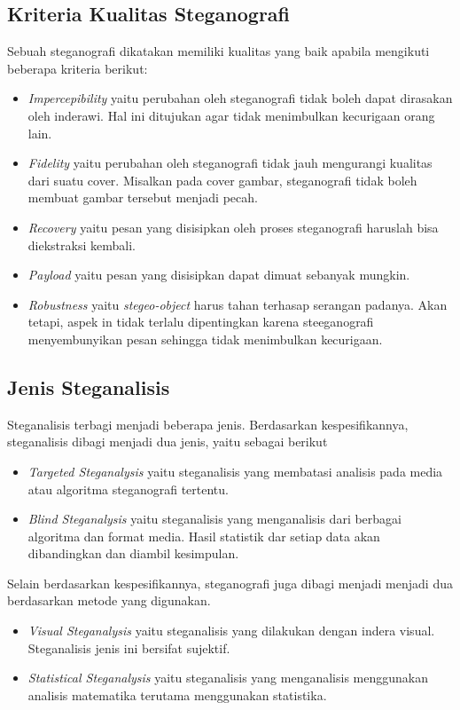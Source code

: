 \documentclass[10pt,conference]{IEEEtran}
\theoremstyle{definition}
\begin{document}
\subsection{Kriteria Kualitas Steganografi}
Sebuah steganografi dikatakan memiliki kualitas yang baik apabila mengikuti beberapa kriteria berikut:

\begin{itemize}
    \item \emph{Impercepibility} yaitu perubahan oleh steganografi tidak boleh dapat dirasakan oleh inderawi. Hal ini ditujukan agar
    tidak menimbulkan kecurigaan orang lain.
    \item \emph{Fidelity} yaitu perubahan oleh steganografi tidak jauh mengurangi kualitas dari suatu cover. Misalkan pada cover gambar,
    steganografi tidak boleh membuat gambar tersebut menjadi pecah.
    \item \emph{Recovery} yaitu pesan yang disisipkan oleh proses steganografi haruslah bisa diekstraksi kembali.
    \item \emph{Payload} yaitu pesan yang disisipkan dapat dimuat sebanyak mungkin.
    \item \emph{Robustness} yaitu \emph{stegeo-object} harus tahan terhasap serangan padanya. Akan tetapi, aspek in
    tidak terlalu dipentingkan karena steeganografi menyembunyikan pesan sehingga tidak menimbulkan kecurigaan.
\end{itemize}

\subsection{Jenis Steganalisis}
Steganalisis terbagi menjadi beberapa jenis. Berdasarkan kespesifikannya, steganalisis dibagi menjadi dua jenis, yaitu sebagai berikut
\begin{itemize}
    \item \emph{Targeted Steganalysis} yaitu steganalisis yang membatasi analisis pada media atau algoritma steganografi tertentu. 
    \item \emph{Blind Steganalysis} yaitu steganalisis yang menganalisis dari berbagai algoritma dan format media. Hasil statistik dar
    setiap data akan dibandingkan dan diambil kesimpulan.
\end{itemize}

Selain berdasarkan kespesifikannya, steganografi juga dibagi menjadi menjadi dua berdasarkan metode yang digunakan.
\begin{itemize}
    \item \emph{Visual Steganalysis} yaitu steganalisis yang dilakukan dengan indera visual. Steganalisis jenis ini bersifat sujektif.
    \item \emph{Statistical Steganalysis} yaitu steganalisis yang menganalisis menggunakan analisis matematika terutama menggunakan statistika.
\end{itemize}
\end{document}
